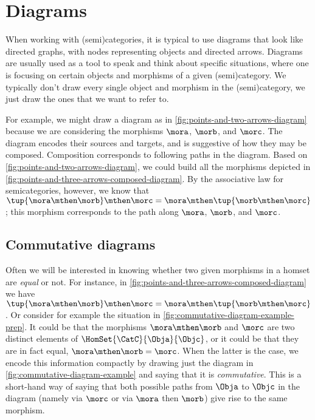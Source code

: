 
\section{Diagrams}

When working with (semi)categories, it is typical to use diagrams that look like directed graphs, with nodes representing objects and directed arrows.
Diagrams are usually used as a tool to speak and think about specific situations, where one is focusing on certain objects and morphisms of a given (semi)category.
We typically don't draw every single object and morphism in the (semi)category, we just draw the ones that we want to refer to.

\begin{marginfigure}
    \centering
    \caption{}
    \label{fig:points-and-three-arrows-diagram}
\end{marginfigure}

\begin{marginfigure}
    \centering
    \caption{}
    \label{fig:points-and-three-arrows-composed-diagram}
\end{marginfigure}

For example, we might draw a diagram as in \cref{fig:points-and-two-arrows-diagram} because we are considering the morphisms $\mora$, $\morb$, and $\morc$.
The diagram encodes their sources and targets, and is suggestive of how they may be composed.
Composition corresponds to following paths in the diagram.
Based on \cref{fig:points-and-two-arrows-diagram}, we could build all the morphisms depicted in \cref{fig:points-and-three-arrows-composed-diagram}.
By the associative law for semicategories, however, we know that $\tup{\mora \mthen \morb} \mthen \morc = \mora \mthen \tup{\morb \mthen \morc}$; this morphism corresponds to the path along $\mora$, $\morb$, and $\morc$.

\subsection{Commutative diagrams}

Often we will be interested in knowing whether two given morphisms in a homset are \emph{equal} or not.
For instance, in \cref{fig:points-and-three-arrows-composed-diagram} we have $\tup{\mora \mthen \morb} \mthen \morc = \mora \mthen \tup{\morb \mthen \morc}$.
Or consider for example the situation in \cref{fig:commutative-diagram-example-prep}.
It could be that the morphisms $\mora \mthen \morb$ and $\morc$ are two distinct elements of $\HomSet{\CatC}{\Obja}{\Objc}$, or it could be that they are in fact equal,  $\mora \mthen \morb = \morc$.
When the latter is the case, we encode this information compactly by drawing just the diagram in \cref{fig:commutative-diagram-example} and saying that it is \emph{commutative}.
This is a short-hand way of saying that both possible paths from $\Obja$ to $\Objc$ in the diagram (namely via $\morc$ or via $\mora$ then $\morb$) give rise to the same morphism.

